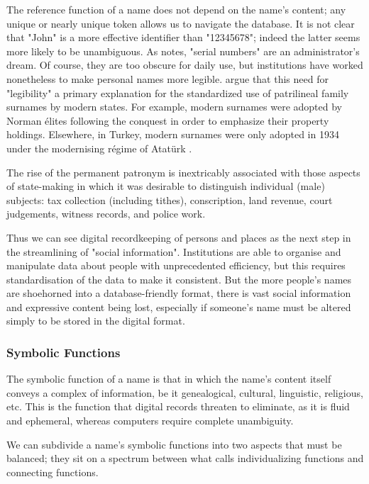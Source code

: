 The reference function of a name does not depend on the name's content; any
unique or nearly unique token allows us to navigate the database. It is not
clear that "John" is a more effective identifier than "12345678"; indeed the
latter seems more likely to be unambiguous. As \textcite{scott02} notes, "serial
numbers" are an administrator's dream. Of course, they are too obscure for daily
use, but institutions have worked nonetheless to make personal names more
legible. \textcite{scott02} argue that this need for "legibility" a primary
explanation for the standardized use of patrilineal family surnames by modern
states. For example, modern surnames were adopted by Norman élites following the
conquest in order to emphasize their property holdings. Elsewhere, in Turkey,
modern surnames were only adopted in 1934 under the modernising régime of
Atatürk \parencite{scott02}.

\begin{aquote}{\parencite{scott02}}
The rise of the permanent patronym is inextricably associated with those aspects
of state-making in which it was desirable to distinguish individual (male)
subjects: tax collection (including tithes), conscription, land revenue, court
judgements, witness records, and police work.
\end{aquote}

Thus we can see digital recordkeeping of persons and places as the next step in
the streamlining of "social information". Institutions are able to organise and
manipulate data about people with unprecedented efficiency, but this requires
standardisation of the data to make it consistent. But the more people's names
are shoehorned into a database-friendly format, there is vast social information
and expressive content being lost, especially if someone's name must be altered
simply to be stored in the digital format.

\subsubsection{Symbolic Functions}

The symbolic function of a name is that in which the name's content itself
conveys a complex of information, be it genealogical, cultural, linguistic,
religious, etc. This is the function that digital records threaten to eliminate,
as it is fluid and ephemeral, whereas computers require complete unambiguity.

We can subdivide a name's symbolic functions into two aspects that must be
balanced; they sit on a spectrum between what \textcite{finch08} calls
individualizing functions and connecting functions.

